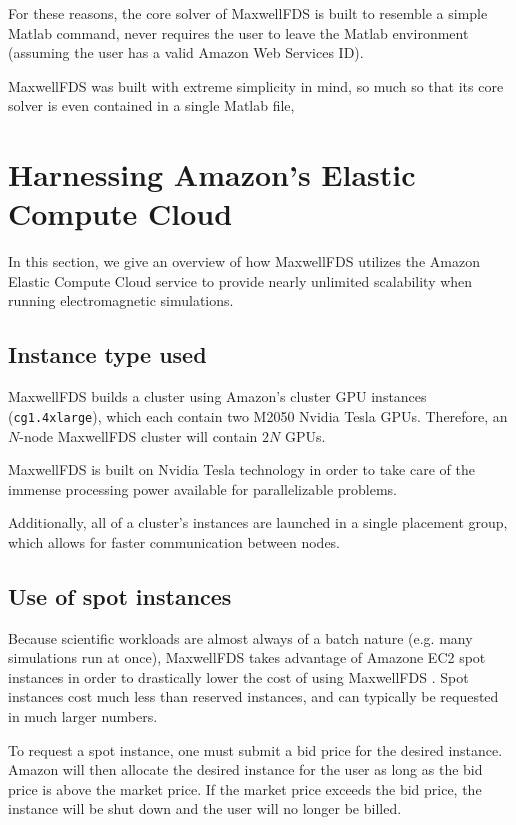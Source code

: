 \documentclass{article}
\newcommand{\MaxwellFDS}{MaxwellFDS }
\begin{document}
For these reasons, the core solver of \MaxwellFDS is built
    \BI to resemble a simple Matlab command,
    \I  never requires the user to leave the Matlab environment
            (assuming the user has a valid Amazon Web Services ID). \EI

\MaxwellFDS was built with extreme simplicity in mind,
    so much so that its core solver is even contained in a single Matlab file,

\section{Harnessing Amazon's Elastic Compute Cloud} 
In this section, we give an overview of how \MaxwellFDS utilizes
    the Amazon Elastic Compute Cloud service to 
    provide nearly unlimited scalability when running electromagnetic simulations.

\subsection{Instance type used}
\MaxwellFDS builds a cluster
    using Amazon's cluster GPU instances (\texttt{cg1.4xlarge}),
    which each contain two M2050 Nvidia Tesla GPUs.
Therefore, an $N$-node \MaxwellFDS cluster will contain $2N$ GPUs.

\MaxwellFDS is built on Nvidia Tesla technology in order 
    to take care of the immense processing power available
    for parallelizable problems.

Additionally, all of a cluster's instances are launched
    in a single placement group, %
    which allows for faster communication between nodes.
    
\subsection{Use of spot instances}
Because scientific workloads are almost always of a batch nature
    (e.g. many simulations run at once),
    \MaxwellFDS takes advantage of Amazone EC2 spot instances
    in order to drastically lower the cost of using \MaxwellFDS.
Spot instances cost much less than reserved instances,
    and can typically be requested in much larger numbers.

To request a spot instance, one must submit a bid price
    for the desired instance.
Amazon will then allocate the desired instance for the user
    as long as the bid price is above the market price.
If the market price exceeds the bid price,
    the instance will be shut down and the user will no longer be billed.
\end{document}
